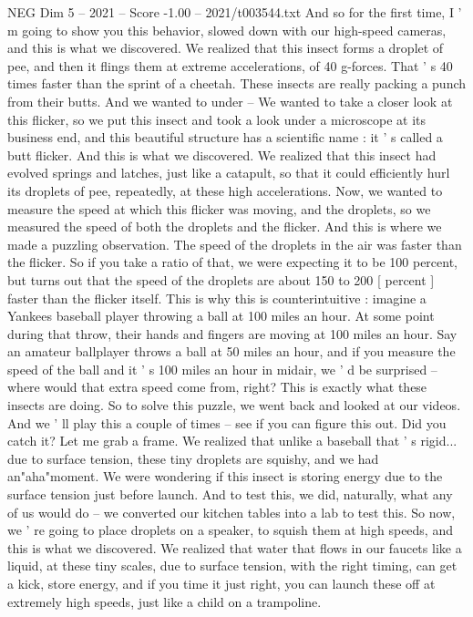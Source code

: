 \begin{textsample}{NEG Dim 5 – 2021 – Score -1.00 – 2021/t003544.txt}
And so for the first time, I ' m going to show you this behavior, slowed down with our high-speed cameras, and this is what we discovered.
We realized that this insect forms a droplet of pee, and then it flings them at extreme accelerations, of 40 g-forces.
That ' s 40 times faster than the sprint of a cheetah.
These insects are really packing a punch from their butts.
And we wanted to under -- We wanted to take a closer look at this flicker, so we put this insect and took a look under a microscope at its business end, and this beautiful structure has a scientific name : it ' s called a butt flicker.
And this is what we discovered.
We realized that this insect had evolved springs and latches, just like a catapult, so that it could efficiently hurl its droplets of pee, repeatedly, at these high accelerations.
Now, we wanted to measure the speed at which this flicker was moving, and the droplets, so we measured the speed of both the droplets and the flicker.
And this is where we made a puzzling observation.
The speed of the droplets in the air was faster than the flicker.
So if you take a ratio of that, we were expecting it to be 100 percent, but turns out that the speed of the droplets are about 150 to 200 [ percent ] faster than the flicker itself.
This is why this is counterintuitive : imagine a Yankees baseball player throwing a ball at 100 miles an hour.
At some point during that throw, their hands and fingers are moving at 100 miles an hour.
Say an amateur ballplayer throws a ball at 50 miles an hour, and if you measure the speed of the ball and it ' s 100 miles an hour in midair, we ' d be surprised -- where would that extra speed come from, right?
This is exactly what these insects are doing.
So to solve this puzzle, we went back and looked at our videos.
And we ' ll play this a couple of times -- see if you can figure this out.
Did you catch it?
Let me grab a frame.
We realized that unlike a baseball that ' s rigid... due to surface tension, these tiny droplets are squishy, and we had an"aha"moment.
We were wondering if this insect is storing energy due to the surface tension just before launch.
And to test this, we did, naturally, what any of us would do -- we converted our kitchen tables into a lab to test this.
So now, we ' re going to place droplets on a speaker, to squish them at high speeds, and this is what we discovered.
We realized that water that flows in our faucets like a liquid, at these tiny scales, due to surface tension, with the right timing, can get a kick, store energy, and if you time it just right, you can launch these off at extremely high speeds, just like a child on a trampoline.

\end{textsample}
